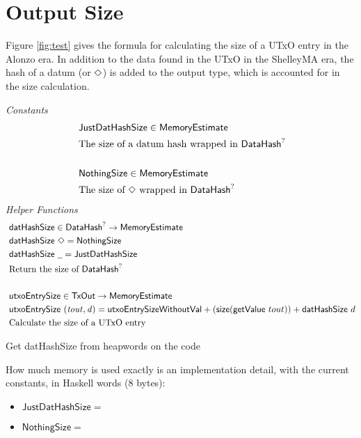 \section{Output Size}
\label{sec:value-size}

Figure \ref{fig:test} gives the formula for calculating the size of a UTxO entry
in the Alonzo era. In addition to the data found in the UTxO in the ShelleyMA
era, the hash of a datum (or $\Diamond$) is added to the output type, which
is accounted for in the size calculation.

\begin{figure*}[h]
  \emph{Constants}
  \begin{align*}
  & \mathsf{JustDatHashSize} \in \mathsf{MemoryEstimate} \\
  & \text{The size of a datum hash wrapped in $\mathsf{DataHash}^?$} \\~
  \\
  & \mathsf{NothingSize} \in \mathsf{MemoryEstimate} \\
  & \text{The size of $\Diamond$ wrapped in $\mathsf{DataHash}^?$}
  \end{align*}
  \emph{Helper Functions}
  \begin{align*}
    & \fun{datHashSize} \in \DataHash^? \to \MemoryEstimate \\
    & \fun{datHashSize}~ \Nothing = \mathsf{NothingSize} \\
    & \fun{datHashSize}~ \wcard = \mathsf{JustDatHashSize} \\
    & \text{Return the size of $\DataHash^?$} \\~\\
    & \fun{utxoEntrySize} \in \TxOut \to \MemoryEstimate \\
    & \fun{utxoEntrySize}~\var{(tout, d)} = \mathsf{utxoEntrySizeWithoutVal} + (\fun{size} (\fun{getValue}~tout)) + \mathsf{datHashSize}~d \\
    & \text{Calculate the size of a UTxO entry}
  \end{align*}
  \caption{Value Size}
  \label{fig:test}
\end{figure*}

\begin{note}
  Get datHashSize from heapwords on the code
\end{note}

How much memory is used exactly is an implementation detail, with the current constants, in Haskell words (8 bytes):

\begin{itemize}
  \item $\mathsf{JustDatHashSize} = $
  \item $\mathsf{NothingSize} = $
\end{itemize}
